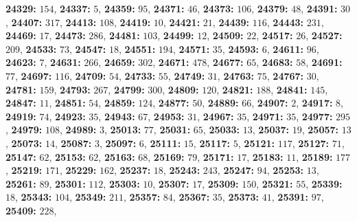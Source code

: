 \textsf{\bfseries 24329:} $154$, \textsf{\bfseries 24337:} $5$, \textsf{\bfseries 24359:} $95$, \textsf{\bfseries 24371:} $46$, \textsf{\bfseries 24373:} $106$, \textsf{\bfseries 24379:} $48$, \textsf{\bfseries 24391:} $30$, \textsf{\bfseries 24407:} $317$, \textsf{\bfseries 24413:} $108$, \textsf{\bfseries 24419:} $10$, \textsf{\bfseries 24421:} $21$, \textsf{\bfseries 24439:} $116$, \textsf{\bfseries 24443:} $231$, \textsf{\bfseries 24469:} $17$, \textsf{\bfseries 24473:} $286$, \textsf{\bfseries 24481:} $103$, \textsf{\bfseries 24499:} $12$, \textsf{\bfseries 24509:} $22$, \textsf{\bfseries 24517:} $26$, \textsf{\bfseries 24527:} $209$, \textsf{\bfseries 24533:} $73$, \textsf{\bfseries 24547:} $18$, \textsf{\bfseries 24551:} $194$, \textsf{\bfseries 24571:} $35$, \textsf{\bfseries 24593:} $6$, \textsf{\bfseries 24611:} $96$, \textsf{\bfseries 24623:} $7$, \textsf{\bfseries 24631:} $266$, \textsf{\bfseries 24659:} $302$, \textsf{\bfseries 24671:} $478$, \textsf{\bfseries 24677:} $65$, \textsf{\bfseries 24683:} $58$, \textsf{\bfseries 24691:} $77$, \textsf{\bfseries 24697:} $116$, \textsf{\bfseries 24709:} $54$, \textsf{\bfseries 24733:} $55$, \textsf{\bfseries 24749:} $31$, \textsf{\bfseries 24763:} $75$, \textsf{\bfseries 24767:} $30$, \textsf{\bfseries 24781:} $159$, \textsf{\bfseries 24793:} $267$, \textsf{\bfseries 24799:} $300$, \textsf{\bfseries 24809:} $120$, \textsf{\bfseries 24821:} $188$, \textsf{\bfseries 24841:} $145$, \textsf{\bfseries 24847:} $11$, \textsf{\bfseries 24851:} $54$, \textsf{\bfseries 24859:} $124$, \textsf{\bfseries 24877:} $50$, \textsf{\bfseries 24889:} $66$, \textsf{\bfseries 24907:} $2$, \textsf{\bfseries 24917:} $8$, \textsf{\bfseries 24919:} $74$, \textsf{\bfseries 24923:} $35$, \textsf{\bfseries 24943:} $67$, \textsf{\bfseries 24953:} $31$, \textsf{\bfseries 24967:} $35$, \textsf{\bfseries 24971:} $35$, \textsf{\bfseries 24977:} $295$, \textsf{\bfseries 24979:} $108$, \textsf{\bfseries 24989:} $3$, \textsf{\bfseries 25013:} $77$, \textsf{\bfseries 25031:} $65$, \textsf{\bfseries 25033:} $13$, \textsf{\bfseries 25037:} $19$, \textsf{\bfseries 25057:} $13$, \textsf{\bfseries 25073:} $14$, \textsf{\bfseries 25087:} $3$, \textsf{\bfseries 25097:} $6$, \textsf{\bfseries 25111:} $15$, \textsf{\bfseries 25117:} $5$, \textsf{\bfseries 25121:} $117$, \textsf{\bfseries 25127:} $71$, \textsf{\bfseries 25147:} $62$, \textsf{\bfseries 25153:} $62$, \textsf{\bfseries 25163:} $68$, \textsf{\bfseries 25169:} $79$, \textsf{\bfseries 25171:} $17$, \textsf{\bfseries 25183:} $11$, \textsf{\bfseries 25189:} $177$, \textsf{\bfseries 25219:} $171$, \textsf{\bfseries 25229:} $162$, \textsf{\bfseries 25237:} $18$, \textsf{\bfseries 25243:} $243$, \textsf{\bfseries 25247:} $94$, \textsf{\bfseries 25253:} $13$, \textsf{\bfseries 25261:} $89$, \textsf{\bfseries 25301:} $112$, \textsf{\bfseries 25303:} $10$, \textsf{\bfseries 25307:} $17$, \textsf{\bfseries 25309:} $150$, \textsf{\bfseries 25321:} $55$, \textsf{\bfseries 25339:} $18$, \textsf{\bfseries 25343:} $104$, \textsf{\bfseries 25349:} $211$, \textsf{\bfseries 25357:} $84$, \textsf{\bfseries 25367:} $35$, \textsf{\bfseries 25373:} $41$, \textsf{\bfseries 25391:} $97$, \textsf{\bfseries 25409:} $228$, 
